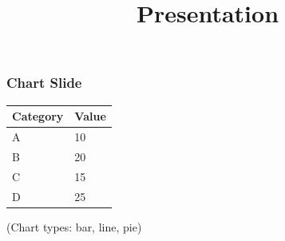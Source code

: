 \documentclass{beamer}
\title{Presentation}
\begin{document}
\begin{frame}
\frametitle{Chart Slide}
\begin{tabular}{ll}
\toprule
Category & Value \\
\midrule
A & 10 \\
B & 20 \\
C & 15 \\
D & 25 \\
\bottomrule
\end{tabular}

(Chart types: bar, line, pie)
\end{frame}
\end{document}
